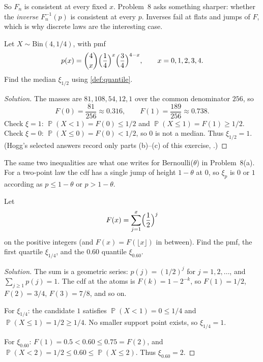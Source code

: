 \documentclass[11pt,a4paper]{article}
\DeclareMathOperator{\Pbb}{\mathbb{P}}
\begin{document}
So \(F_n\) is consistent at every fixed \(x\). Problem~8 asks something sharper: whether the \emph{inverse} \(F_n^{-1}(p)\) is consistent at every \(p\). Inverses fail at flats and jumps of \(F\), which is why discrete laws are the interesting case.

\begin{exercise}
\label{ex:hogg-179a}
Let \(X\sim\mathrm{Bin}(4,1/4)\), with pmf
\[
p(x)
=
\binom{4}{x}\Bigl(\frac14\Bigr)^x\Bigl(\frac34\Bigr)^{4-x},
\qquad
x=0,1,2,3,4.
\]
Find the median \(\xi_{1/2}\) using \cref{def:quantile}.
\end{exercise}

\begin{proof}[Solution]
The masses are \(81,108,54,12,1\) over the common denominator \(256\), so
\[
F(0)
=
\frac{81}{256}
\approx 0.316,
\qquad
F(1)
=
\frac{189}{256}
\approx 0.738.
\]
Check \(\xi=1\): \(\Pbb(X<1)=F(0)\le 1/2\) and \(\Pbb(X\le 1)=F(1)\ge 1/2\). Check \(\xi=0\): \(\Pbb(X\le 0)=F(0)<1/2\), so \(0\) is not a median. Thus \(\xi_{1/2}=1\). (Hogg's selected answers record only parts (b)--(c) of this exercise, \citep[Appendix~F]{hogg2019}.)
\end{proof}

The same two inequalities are what one writes for Bernoulli(\(\theta\)) in Problem~8(a). For a two-point law the cdf has a single jump of height \(1-\theta\) at \(0\), so \(\xi_p\) is \(0\) or \(1\) according as \(p\le 1-\theta\) or \(p>1-\theta\).

\begin{exercise}
\label{ex:hogg-1711d}
Let
\[
F(x)
=
\sum_{j=1}^{x}\Bigl(\frac12\Bigr)^{j}
\]
on the positive integers (and \(F(x)=F(\lfloor x\rfloor)\) in between). Find the pmf, the first quartile \(\xi_{1/4}\), and the \(0.60\) quantile \(\xi_{0.60}\).
\end{exercise}

\begin{proof}[Solution]
The sum is a geometric series: \(p(j)=(1/2)^j\) for \(j=1,2,\dots\), and \(\sum_{j\ge 1}p(j)=1\). The cdf at the atoms is \(F(k)=1-2^{-k}\), so \(F(1)=1/2\), \(F(2)=3/4\), \(F(3)=7/8\), and so on.

For \(\xi_{1/4}\): the candidate \(1\) satisfies \(\Pbb(X<1)=0\le 1/4\) and \(\Pbb(X\le 1)=1/2\ge 1/4\). No smaller support point exists, so \(\xi_{1/4}=1\).

For \(\xi_{0.60}\): \(F(1)=0.5<0.60\le 0.75=F(2)\), and \(\Pbb(X<2)=1/2\le 0.60\le \Pbb(X\le 2)\). Thus \(\xi_{0.60}=2\).
\end{proof}
\end{document}
